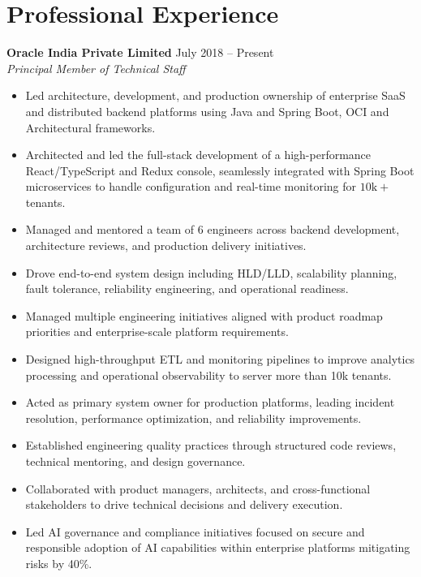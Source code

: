 \documentclass[11pt,a4paper]{article}
\begin{document}
\section*{Professional Experience}

\textbf{Oracle India Private Limited} \hfill July 2018 -- Present \\
\textit{Principal Member of Technical Staff}

\begin{itemize}
    \item Led architecture, development, and production ownership of enterprise SaaS and distributed backend platforms using Java and Spring Boot, OCI and Architectural frameworks.

    \item Architected and led the full-stack development of a high-performance React/TypeScript and Redux console, seamlessly integrated with Spring Boot microservices to handle configuration and real-time monitoring for $10\text{k}+$ tenants. 
    
    \item Managed and mentored a team of 6 engineers across backend development, architecture reviews, and production delivery initiatives.
    
    \item Drove end-to-end system design including HLD/LLD, scalability planning, fault tolerance, reliability engineering, and operational readiness.
    
    \item Managed multiple engineering initiatives aligned with product roadmap priorities and enterprise-scale platform requirements.
    
    \item Designed high-throughput ETL and monitoring pipelines to improve analytics processing and operational observability to server more than 10k tenants.
    
    \item Acted as primary system owner for production platforms, leading incident resolution, performance optimization, and reliability improvements.
    
    \item Established engineering quality practices through structured code reviews, technical mentoring, and design governance.
    
    \item Collaborated with product managers, architects, and cross-functional stakeholders to drive technical decisions and delivery execution.
    
    \item Led AI governance and compliance initiatives focused on secure and responsible adoption of AI capabilities within enterprise platforms mitigating risks by 40\%.
\end{itemize}
\end{document}
